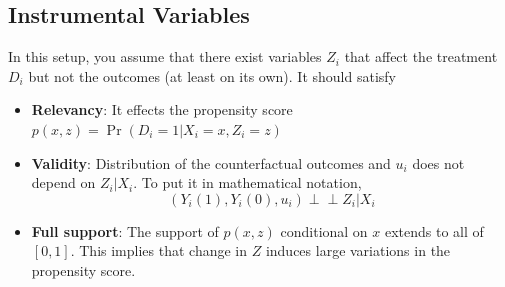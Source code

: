 \documentclass[12pt]{article}
\theoremstyle{definition}
\theoremstyle{property}
\theoremstyle{assumption}
\theoremstyle{example}
\theoremstyle{comment}
\newtheorem{comment}{Comment}[section]
\begin{document}
\subsection{Instrumental Variables}
In this setup, you assume that there exist variables $Z_i$ that affect the treatment $D_i$ but not the outcomes (at least on its own). It should satisfy
\begin{itemize}
\item \textbf{Relevancy}: It effects the propensity score $p(x,z)=\Pr(D_i=1|X_i=x, Z_i=z)$
\item \textbf{Validity}: Distribution of the counterfactual outcomes and $u_i$ does not depend on $Z_i|X_i$. To put it in mathematical notation, 
\[
(Y_i(1), Y_i(0), u_i) \perp \!\!\!\perp Z_i|X_i
\]
\begin{mdframed}[backgroundcolor=yellow!5] 

\end{mdframed}
\item \textbf{Full support}: The support of $p(x,z)$ conditional on $x$ extends to all of $[0,1]$. This implies that change in $Z$ induces large variations in the propensity score. 
\end{itemize} 
\end{document}
